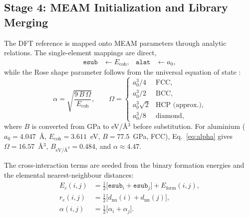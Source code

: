 \subsection{Stage 4: MEAM Initialization and Library Merging}
\label{sec:stage4}

The DFT reference is mapped onto MEAM parameters through analytic relations.
The single-element mappings are direct,
\begin{align*}
	\texttt{esub} &\leftarrow E_\mathrm{coh}, &
	\texttt{alat} &\leftarrow a_0,
\end{align*}
while the Rose shape parameter follows from the universal equation of state
\citep{vinet1989universal}:
\begin{equation}
	\alpha = \sqrt{\frac{9\,B\,\Omega}{E_\mathrm{coh}}}, \qquad
	\Omega = \begin{cases}
		a_0^3/4              & \text{FCC}, \\
		a_0^3/2              & \text{BCC}, \\
		a_0^3 \sqrt{2}       & \text{HCP (approx.)}, \\
		a_0^3/8              & \text{diamond},
	\end{cases}
	\label{eq:alpha}
\end{equation}
where $B$ is converted from GPa to eV/\AA{}$^3$ before substitution. For
aluminium ($a_0=4.047$~\AA, $E_\mathrm{coh}=3.611$~eV, $B=77.5$~GPa, FCC),
Eq.~\eqref{eq:alpha} gives $\Omega=16.57$~\AA{}$^3$,
$B_{\text{eV/\AA{}}^3}=0.484$, and $\alpha\approx 4.47$.

The cross-interaction terms are seeded from the binary formation energies and
the elemental nearest-neighbour distances:
\begin{align}
	E_c(i,j)     &= \tfrac{1}{2}\bigl[\texttt{esub}_i + \texttt{esub}_j\bigr] + E_\mathrm{form}(i,j), \\
	r_e(i,j)     &= \tfrac{1}{2}\bigl[d_\mathrm{nn}(i) + d_\mathrm{nn}(j)\bigr], \\
	\alpha(i,j)  &= \tfrac{1}{2}\bigl[\alpha_i + \alpha_j\bigr].
\end{align}

